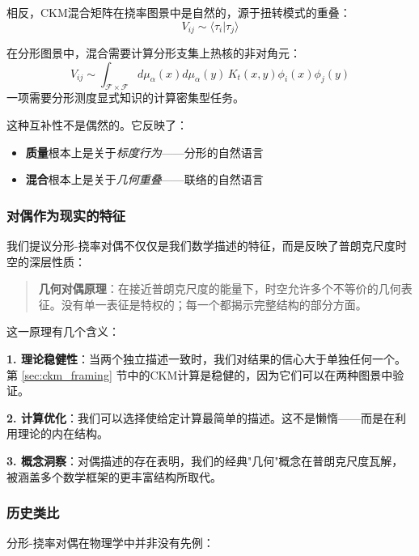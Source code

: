 \begin{example}[混合角]
相反，CKM混合矩阵在挠率图景中是自然的，源于扭转模式的重叠：
\begin{equation}
    V_{ij} \sim \langle \tau_i | \tau_j \rangle
\end{equation}

在分形图景中，混合需要计算分形支集上热核的非对角元：
\begin{equation}
    V_{ij} \sim \int_{\mathcal{F} \times \mathcal{F}} d\mu_\alpha(x) d\mu_\alpha(y) \, K_t(x,y) \phi_i(x) \phi_j(y)
\end{equation}
一项需要分形测度显式知识的计算密集型任务。
\end{example}

这种互补性不是偶然的。它反映了：
\begin{itemize}
    \item \textbf{质量}根本上是关于\textit{标度行为}——分形的自然语言
    \item \textbf{混合}根本上是关于\textit{几何重叠}——联络的自然语言
\end{itemize}

\subsubsection{对偶作为现实的特征}

我们提议分形-挠率对偶不仅仅是我们数学描述的特征，而是反映了普朗克尺度时空的深层性质：

\begin{quote}
\textbf{几何对偶原理}：在接近普朗克尺度的能量下，时空允许多个不等价的几何表征。没有单一表征是特权的；每一个都揭示完整结构的部分方面。
\end{quote}

这一原理有几个含义：

\textbf{1. 理论稳健性}：当两个独立描述一致时，我们对结果的信心大于单独任何一个。第 \ref{sec:ckm_framing} 节中的CKM计算是稳健的，因为它们可以在两种图景中验证。

\textbf{2. 计算优化}：我们可以选择使给定计算最简单的描述。这不是懒惰——而是在利用理论的内在结构。

\textbf{3. 概念洞察}：对偶描述的存在表明，我们的经典"几何"概念在普朗克尺度瓦解，被涵盖多个数学框架的更丰富结构所取代。

\subsubsection{历史类比}

分形-挠率对偶在物理学中并非没有先例：

